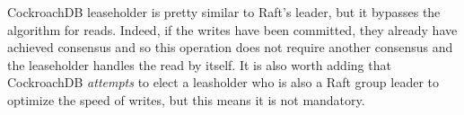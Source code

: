 CockroachDB leaseholder is pretty similar to Raft's leader, but it bypasses the algorithm for reads. Indeed, if the writes have been committed, they already have achieved consensus and so this operation does not require another consensus and the leaseholder handles the read by itself. It is also worth adding that CockroachDB \emph{attempts} to elect a leasholder who is also a Raft group leader to optimize the speed of writes, but this means it is not mandatory\cite{CRDB:replication-layer}.
